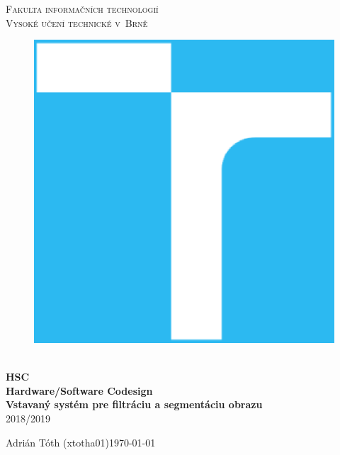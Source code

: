 \documentclass[11pt,a4paper]{article}
\begin{document}
\begin{titlepage}
    \begin{center}
        \Huge
        \textsc{
            Fakulta informačních technologií\\
            Vysoké učení technické v~Brně
        }
        \vspace{80px}
        \begin{figure}[!h]
            \centering
            \includegraphics[scale=0.3]{vutbr-fit-logo.eps}
        \end{figure}
        \\[15mm]
        \Huge{
            \textbf{
                HSC
            }
        }
        \\[1.5mm]
        \huge{
            \textbf{
                Hardware/Software Codesign
            }
        }
        \\[2.5em]
        \LARGE{
            \textbf{
                Vstavaný systém pre filtráciu a segmentáciu obrazu
            }
        }
        \\[2.5em]
        \Large{2018/2019}
        \vfill
    \end{center}
        \Large{
            Adrián Tóth (xtotha01)\hfill \today
        }
\end{titlepage}

\setlength{\parskip}{0pt}
\hypersetup{hidelinks}\tableofcontents
\setlength{\parskip}{0pt}
\end{document}
